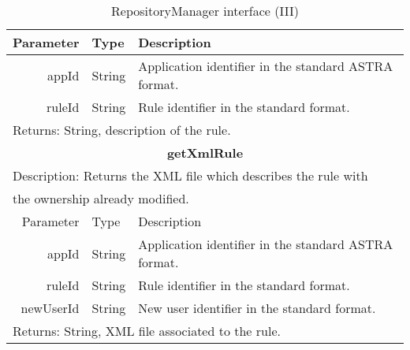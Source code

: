 \begin{table}[h!]
\begin{center}
\begin{tabular}{||r|l|l||}
		\hline \hline 
		Parameter & Type & Description \\ 
		\hline \hline
			appId & String & Application identifier in the standard ASTRA format. \\
			ruleId & String & Rule identifier in the standard format. \\
		\hline \hline
		\multicolumn{3}{||l||}{Returns: String, description of the rule.} \\
		\hline \hline
		
		\hline \hline
		\multicolumn{3}{||c||}{\bfseries{getXmlRule}} \\
		\hline
		\hline 
		\multicolumn{3}{||l||}{Description: Returns the XML file which describes the
		rule with} \\ 
		\multicolumn{3}{||l||}{the ownership already modified.} \\ 
		
		\hline \hline 
		Parameter & Type & Description \\ 
		\hline \hline
			appId & String & Application identifier in the standard ASTRA format. \\
			ruleId & String & Rule identifier in the standard format. \\
			newUserId & String & New user identifier in the standard format. \\
		\hline \hline
		\multicolumn{3}{||l||}{Returns: String, XML file associated to the rule.} \\
		\hline \hline
		

		

		
		\end{tabular}
		\caption{\label{table:rm-interface-3} RepositoryManager interface (III)}
	\end{center}
\end{table}

% 		
% 
% 	



